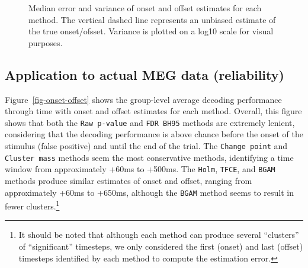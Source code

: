 \documentclass[
  doc,
  floatsintext,
  longtable,
  a4paper,
  nolmodern,
  notxfonts,
  notimes,
  colorlinks=true,linkcolor=blue,citecolor=blue,urlcolor=blue]{apa7}
\begin{document}
\begin{figure}[!htb]

\caption{\label{fig-simulation-results}Median error and variance of
onset and offset estimates for each method. The vertical dashed line
represents an unbiased estimate of the true onset/ofsset. Variance is
plotted on a log10 scale for visual purposes.}


\end{figure}%

\newpage

\subsection{Application to actual MEG data
(reliability)}\label{application-to-actual-meg-data-reliability}

Figure~\ref{fig-onset-offset} shows the group-level average decoding
performance through time with onset and offset estimates for each
method. Overall, this figure shows that both the \texttt{Raw\ p-value}
and \texttt{FDR\ BH95} methods are extremely lenient, considering that
the decoding performance is above chance before the onset of the
stimulus (false positive) and until the end of the trial. The
\texttt{Change\ point} and \texttt{Cluster\ mass} methods seem the most
conservative methods, identifying a time window from approximately +60ms
to +500ms. The \texttt{Holm}, \texttt{TFCE}, and \texttt{BGAM} methods
produce similar estimates of onset and offset, ranging from
approximately +60ms to +650ms, although the \texttt{BGAM} method seems
to result in fewer clusters.\footnote{It should be noted that although
  each method can produce several ``clusters'' of ``significant''
  timesteps, we only considered the first (onset) and last (offset)
  timesteps identified by each method to compute the estimation error.}
\end{document}
